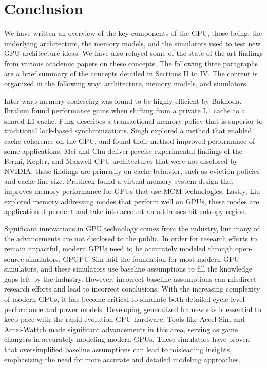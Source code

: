 \documentclass[conference]{IEEEtran}
\begin{document}



\section{Conclusion}
We have written an overview of the key components of the GPU, those being, the underlying architecture, the memory models, and the simulators used to test new GPU architecture ideas.
We have also relayed some of the state of the art findings from various academic papers on these concepts.
The following three paragraphs are a brief summary of the concepts detailed in Sections II to IV. The content is organized in the following way: architecture, memory models, and simulators.

Inter-warp memory coalescing was found to be highly efficient by Bakhoda.
Ibrahim found performance gains when shifting from a private L1 cache to a shared L1 cache.
Fung describes a transactional memory policy that is superior to traditional lock-based synchronizations.
Singh explored a method that enabled cache coherence on the GPU, and found their method improved performance of some applications.
Mei and Chu deliver precise experimental findings of the Fermi, Kepler, and Maxwell GPU architectures that were not disclosed by NVIDIA; these findings are primarily on cache behavior, such as eviction policies and cache line size.
Pratheek found a virtual memory system design that improves memory performance for GPUs that use MCM technologies.
Lastly, Liu explored memory addressing modes that perform well on GPUs, these modes are application dependent and take into account an addresses bit entropy region.

Significant innovations in GPU technology comes from the industry, but many of the advancements are not disclosed to the public.
In order for research efforts to remain impactful, modern GPUs need to be accurately modeled through open-source simulators.
GPGPU-Sim laid the foundation for most modern GPU simulators, and these simulators use baseline assumptions to fill the knowledge gaps left by the industry.
However, incorrect baseline assumptions can misdirect research efforts and lead to incorrect conclusions.
With the increasing complexity of modern GPUs, it has become critical to simulate both detailed cycle-level performance and power models.
Developing generalized frameworks is essential to keep pace with the rapid evolution GPU hardware.
Tools like Accel-Sim and Accel-Wattch made significant advancements in this area, serving as game changers in accurately modeling modern GPUs.
These simulators have proven that oversimplified baseline assumptions can lead to misleading insights, emphasizing the need for more accurate and detailed modeling approaches.
\end{document}
